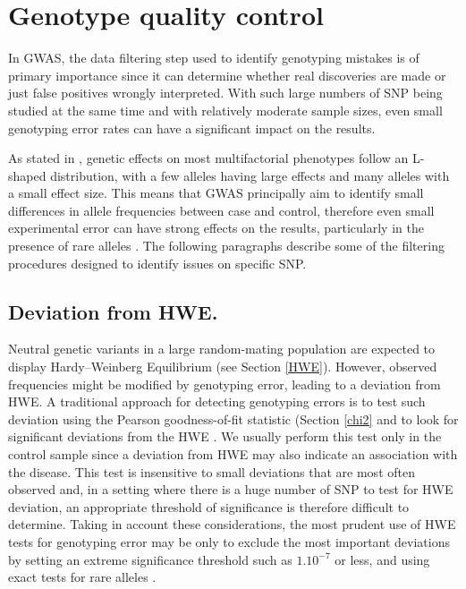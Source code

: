 \documentclass[]{book}
\begin{document}
\hypertarget{genoquality}{%
\section{Genotype quality control}\label{genoquality}}

In GWAS, the data filtering step used to identify genotyping mistakes is
of primary importance since it can determine whether real discoveries
are made or just false positives wrongly interpreted. With such large
numbers of SNP being studied at the same time and with relatively
moderate sample sizes, even small genotyping error rates can have a
significant impact on the results.

As stated in \citep{wright2001complex}, genetic effects on most
multifactorial phenotypes follow an L-shaped distribution, with a few
alleles having large effects and many alleles with a small effect size.
This means that GWAS principally aim to identify small differences in
allele frequencies between case and control, therefore even small
experimental error can have strong effects on the results, particularly
in the presence of rare alleles
\citep{clayton2005population, barrett2006evaluating}. The following
paragraphs describe some of the filtering procedures designed to
identify issues on specific SNP.

\hypertarget{deviation-from-hwe.}{%
\subsection{Deviation from HWE.}\label{deviation-from-hwe.}}

Neutral genetic variants in a large random-mating population are
expected to display Hardy--Weinberg Equilibrium (see Section
\ref{HWE}). However, observed frequencies might be modified by
genotyping error, leading to a deviation from HWE. A traditional
approach for detecting genotyping errors is to test such deviation using
the Pearson goodness-of-fit statistic (Section \ref{chi2} and to
look for significant deviations from the HWE \citep{weir1996genetic}. We
usually perform this test only in the control sample since a deviation
from HWE may also indicate an association with the disease. This test is
insensitive to small deviations that are most often observed and, in a
setting where there is a huge number of SNP to test for HWE deviation,
an appropriate threshold of significance is therefore difficult to
determine. Taking in account these considerations, the most prudent use
of HWE tests for genotyping error may be only to exclude the most
important deviations by setting an extreme significance threshold such
as \(1.10^{-7}\) or less, and using exact tests for rare alleles
\citep{weir2005measures}.
\end{document}

